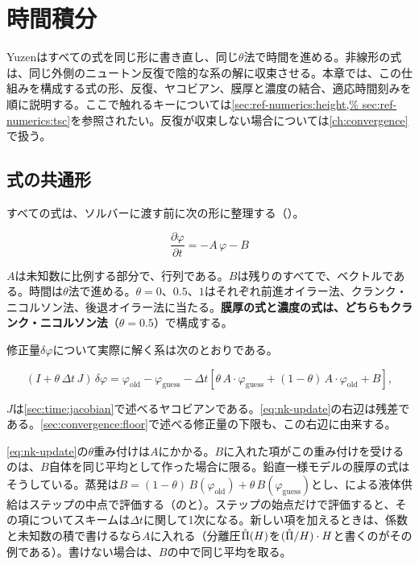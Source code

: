 \chapter{時間積分}
\label{ch:timeintegration}

Yuzenはすべての式を同じ形に書き直し、同じ$\theta$法で時間を進める。非線形の式は、同じ外側のニュートン反復で陰的な系の解に収束させる。本章では、この仕組みを構成する式の形、反復、ヤコビアン、膜厚と濃度の結合、適応時間刻みを順に説明する。ここで触れるキーについては\cref{sec:ref-numerics:height,%
sec:ref-numerics:tsc}を参照されたい。反復が収束しない場合については\cref{ch:convergence}で扱う。

\section{式の共通形}
\label{sec:time:form}

すべての式は、ソルバーに渡す前に次の形に整理する（）。

\[
  \frac{\partial\varphi}{\partial t} = -A\,\varphi - B
\]

$A$は未知数に比例する部分で、行列である。$B$は残りのすべてで、ベクトルである。時間は$\theta$法で進める。$\theta = 0$、$0.5$、$1$はそれぞれ前進オイラー法、クランク・ニコルソン法、後退オイラー法に当たる。\textbf{膜厚の式と濃度の式は、どちらもクランク・ニコルソン法}（$\theta = 0.5$）で構成する。

修正量$\delta\varphi$について実際に解く系は次のとおりである。

\begin{equation}\label{eq:nk-update}
  (I + \theta\,\Delta t\,J)\,\delta\varphi
    = \varphi_{\mathrm{old}} - \varphi_{\mathrm{guess}}
      - \Delta t\left[\theta\,A\cdot\varphi_{\mathrm{guess}}
        + (1-\theta)\,A\cdot\varphi_{\mathrm{old}} + B\right],
\end{equation}

$J$は\cref{sec:time:jacobian}で述べるヤコビアンである。\cref{eq:nk-update}の右辺は残差である。\cref{sec:convergence:floor}で述べる修正量の下限も、この右辺に由来する。

\begin{warn}[$B$に入れた項も時間平均が必要]
  \cref{eq:nk-update}の$\theta$重み付けは$A$にかかる。$B$に入れた項がこの重み付けを受けるのは、$B$自体を同じ平均として作った場合に限る。鉛直一様モデルの膜厚の式はそうしている。蒸発は$B = (1-\theta)\,B(\varphi_{\mathrm{old}})
  + \theta\,B(\varphi_{\mathrm{guess}})$とし、による液体供給はステップの中点で評価する（のと）。ステップの始点だけで評価すると、その項についてスキームは$\Delta t$に関して1次になる。新しい項を加えるときは、係数と未知数の積で書けるなら$A$に入れる（分離圧$\hat{\Pi}(H)$を$(\hat{\Pi}/H)\cdot H$と書くのがその例である）。書けない場合は、$B$の中で同じ平均を取る。
\end{warn}

